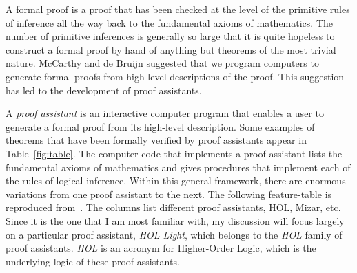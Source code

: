 \documentclass{llncs}
\begin{document}
A formal proof is a proof that has been checked at the level of the
primitive rules of inference all the way back to the fundamental
axioms of mathematics.  The number of primitive inferences is
generally so large that it is quite hopeless to construct a formal
proof by hand of anything but theorems of the most trivial nature.
McCarthy and de Bruijn suggested that we program computers to generate
formal proofs from high-level descriptions of the proof.  This
suggestion has led to the development of proof assistants.


A {\it proof assistant} is an interactive computer program that
enables a user to generate a formal proof from its high-level
description.  Some examples of theorems that have been formally
verified by proof assistants appear in Table~\ref{fig:table}.  The
computer code that implements a proof assistant lists the fundamental
axioms of mathematics and gives procedures that implement each of the
rules of logical inference.  Within this general framework, there are
enormous variations from one proof assistant to the next. The
following feature-table is reproduced from~\cite{wiedijk:17}.  The
columns list different proof assistants, HOL, Mizar, etc.  Since it is
the one that I am most familiar with, my discussion will focus largely
on a particular proof assistant, {\it HOL Light}, which belongs to the
{\it HOL} family of proof assistants. {\it HOL} is an acronym for
Higher-Order Logic, which is the underlying logic of these proof
assistants.
\end{document}
